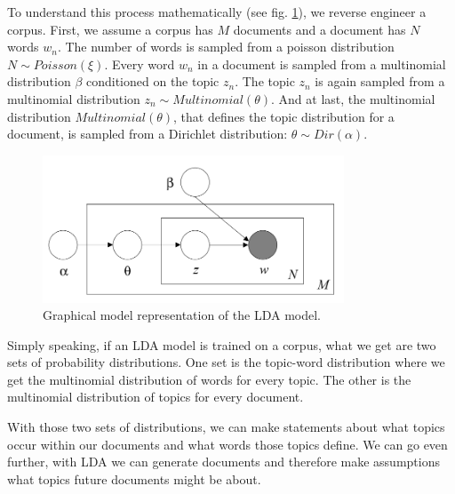 To understand this process mathematically (see fig. \ref{fig:lda}), we reverse engineer a corpus. First, we assume a corpus has $M$ documents and a document has $N$ words $w_n$. The number of words is sampled from a poisson distribution $N\sim Poisson(\xi)$. Every word $w_n$ in a document is sampled from a multinomial distribution $\beta$ conditioned on the topic $z_n$. The topic $z_n$ is again sampled from a multinomial distribution $z_n\sim Multinomial(\theta)$. And at last, the multinomial distribution $Multinomial(\theta)$, that defines the topic distribution for a document, is sampled from a Dirichlet distribution: $\theta\sim Dir(\alpha)$. 
\begin{figure}[H]
    \centering
    \includegraphics[width=0.8\textwidth]{figures/lda}
    \caption{Graphical model representation of the LDA model. \cite{blei2003latent}}
    \label{fig:lda}
\end{figure}

Simply speaking, if an LDA model is trained on a corpus, what we get are two sets of probability distributions. One set is the topic-word distribution where we get the multinomial distribution of words for every topic. The other is the multinomial distribution of topics for every document. 

With those two sets of distributions, we can make statements about what topics occur within our documents and what words those topics define. We can go even further, with LDA we can generate documents and therefore make assumptions what topics future documents might be about. 

